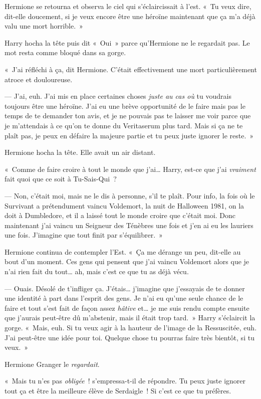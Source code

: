 Hermione se retourna et observa le ciel qui s'éclaircissait à l'est. «~Tu veux dire, dit-elle doucement, si je veux encore être une héroïne maintenant que ça m'a déjà valu une mort horrible.~»

Harry hocha la tête puis dit «~Oui~» parce qu'Hermione ne le regardait pas. Le mot resta comme bloqué dans sa gorge.

«~J'ai réfléchi à ça, dit Hermione. C'était effectivement une mort particulièrement atroce et douloureuse.

--- J'ai, euh. J'ai mis en place certaines choses \emph{juste au cas où} tu voudrais toujours être une héroïne. J'ai eu une brève opportunité de le faire mais pas le temps de te demander ton avis, et je ne pouvais pas te laisser me voir parce que je m'attendais à ce qu'on te donne du Veritaserum plus tard. Mais si ça ne te plaît pas, je peux en défaire la majeure partie et tu peux juste ignorer le reste.~»

Hermione hocha la tête. Elle avait un air distant.

«~Comme de faire croire à tout le monde que j'ai… Harry, est-ce que j'ai \emph{vraiment} fait quoi que ce soit à Tu-Sais-Qui~?

--- Non, c'était moi, mais ne le dis à personne, s'il te plaît. Pour info, la fois où le Survivant a prétendument vaincu Voldemort, la nuit de Halloween 1981, on la doit à Dumbledore, et il a laissé tout le monde croire que c'était moi. Donc maintenant j'ai vaincu un Seigneur des Ténèbres une fois et j'en ai eu les lauriers une fois. J'imagine que tout finit par s'équilibrer.~»

Hermione continua de contempler l'Est. «~Ça me dérange un peu, dit-elle au bout d'un moment. Ces gens qui pensent que j'ai vaincu Voldemort alors que je n'ai rien fait du tout… ah, mais c'est ce que tu as déjà vécu.

--- Ouais. Désolé de t'infliger ça. J'étais… j'imagine que j'essayais de te donner une identité à part dans l'esprit des gens. Je n'ai eu qu'une seule chance de le faire et tout s'est fait de façon assez \emph{hâtive} et… je me suis rendu compte ensuite que j'aurais peut-être dû m'abstenir, mais il était trop tard.~» Harry s'éclaircit la gorge. «~Mais, euh. Si tu veux agir à la hauteur de l'image de la Ressuscitée, euh. J'ai peut-être une idée pour toi. Quelque chose tu pourras faire très bientôt, si tu veux.~»

Hermione Granger le \emph{regardait}.

«~Mais tu n'es pas \emph{obligée}~! s'empressa-t-il de répondre. Tu peux juste ignorer tout ça et être la meilleure élève de Serdaigle~! Si c'est ce que tu préfères.

